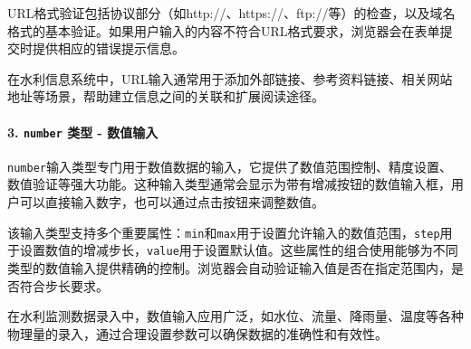 URL格式验证包括协议部分（如http://、https://、ftp://等）的检查，以及域名格式的基本验证。如果用户输入的内容不符合URL格式要求，浏览器会在表单提交时提供相应的错误提示信息。

在水利信息系统中，URL输入通常用于添加外部链接、参考资料链接、相关网站地址等场景，帮助建立信息之间的关联和扩展阅读途径。

\begin{Shaded}
\begin{Highlighting}[]
\DataTypeTok{\textless{}}\OperatorTok{=}\DataTypeTok{\textgreater{}}\DataTypeTok{\textless{}/}\DataTypeTok{\textgreater{}}
\DataTypeTok{\textless{}}\OperatorTok{=}\OtherTok{ }
\OperatorTok{=}\OtherTok{ }
\OperatorTok{=}\OtherTok{ }
\OperatorTok{=}
\OperatorTok{=}\DataTypeTok{\textgreater{}}
\end{Highlighting}
\end{Shaded}

\paragraph{\texorpdfstring{3. \texttt{number} 类型 - 数值输入}{3. number 类型 - 数值输入}}\label{number-ux7c7bux578b---ux6570ux503cux8f93ux5165}

\texttt{number}输入类型专门用于数值数据的输入，它提供了数值范围控制、精度设置、数值验证等强大功能。这种输入类型通常会显示为带有增减按钮的数值输入框，用户可以直接输入数字，也可以通过点击按钮来调整数值。

该输入类型支持多个重要属性：\texttt{min}和\texttt{max}用于设置允许输入的数值范围，\texttt{step}用于设置数值的增减步长，\texttt{value}用于设置默认值。这些属性的组合使用能够为不同类型的数值输入提供精确的控制。浏览器会自动验证输入值是否在指定范围内，是否符合步长要求。

在水利监测数据录入中，数值输入应用广泛，如水位、流量、降雨量、温度等各种物理量的录入，通过合理设置参数可以确保数据的准确性和有效性。

